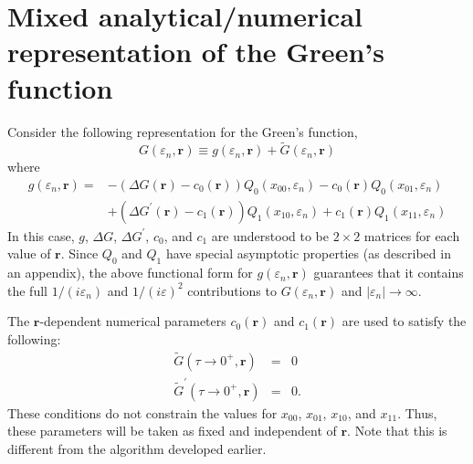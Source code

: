 \chapter{Mixed analytical/numerical representation of the Green's function}
\label{chapter:grepresent}

Consider the following representation for the 
Green's function,
\begin{equation}
G(\varepsilon_n, \mathbf{r}) \equiv g(\varepsilon_n,\mathbf{r})
+ \tilde{G}(\varepsilon_n,\mathbf{r})
\end{equation}
where
\begin{equation}
\label{little_g}
\begin{split}
g(\varepsilon_n,\mathbf{r})  = & -( \Delta G(\mathbf{r})  - c_0(\mathbf{r}) )
Q_0(x_{00},\varepsilon_n) - c_0(\mathbf{r}) Q_0(x_{01}, \varepsilon_n) \\
& + (\Delta G^{\prime}(\mathbf{r}) - c_1(\mathbf{r}))
Q_1(x_{10},\varepsilon_n) + c_1(\mathbf{r})Q_1(x_{11},\varepsilon_n)
\end{split}
\end{equation}
In this case, $g$, $\Delta G$, $\Delta G^{\prime}$, $c_0$, and
$c_1$ are understood to be $2 \times 2$ matrices for each
value of $\mathbf{r}$.
Since $Q_0$ and $Q_1$ have special asymptotic properties
(as described in an appendix), the above functional
form for $g(\varepsilon_n,\mathbf{r})$ guarantees
that it contains the full $1/(i \varepsilon_n)$ and
$1/(i \varepsilon)^2$ contributions
to $G(\varepsilon_n, \mathbf{r})$
and $|\varepsilon_n| \to \infty$.

The $\mathbf{r}$-dependent 
numerical parameters $c_0(\mathbf{r})$ and $c_1(\mathbf{r})$ are used to
satisfy the following:
\begin{eqnarray}
\tilde{G}(\tau \to 0^+, \mathbf{r}) & = & 0 \\
\tilde{G}^{\prime}(\tau \to 0^+, \mathbf{r}) & = & 0.
\end{eqnarray}
These conditions do not
constrain the values 
for $x_{00}$, $x_{01}$, $x_{10}$, and $x_{11}$.
Thus, these parameters will be taken as fixed and independent
of $\mathbf{r}$.  Note that this is different from the
algorithm developed earlier.

